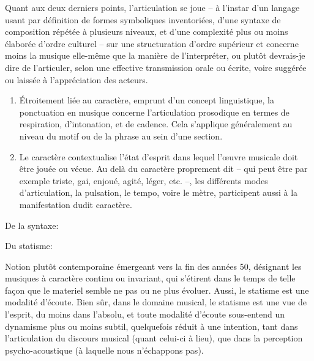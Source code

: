 Quant aux deux derniers points, l'articulation se joue -- à l'instar d'un langage usant par définition de formes symboliques inventoriées, d'une syntaxe de composition répétée à plusieurs niveaux, et d'une complexité plus ou moins élaborée d'ordre culturel -- sur une structuration d'ordre supérieur et concerne moins la musique elle-même que la manière de l'interpréter, ou plutôt devrais-je dire de l'articuler, selon une effective transmission orale ou écrite, voire suggérée ou laissée à l'appréciation des acteurs. 

\begin{enumerate}[resume]

\item {}

Étroitement liée au caractère,  emprunt d'un concept linguistique, la ponctuation en musique concerne l'articulation prosodique en termes de respiration, d'intonation, et de cadence. Cela s'applique généralement au niveau du motif ou de la phrase au sein d'une section.

\item {}

Le caractère contextualise l'état d'esprit dans lequel l'œuvre musicale doit être jouée ou vécue. Au delà du caractère proprement dit -- qui peut être par exemple triste, gai, enjoué, agité, léger, etc. --, les différents modes d'articulation, la pulsation, le tempo, voire le mètre, participent aussi à la manifestation dudit caractère.

\end{enumerate}

\bigskip

De la syntaxe:

\smallskip


\bigskip

Du statisme:

\smallskip 

\noindent Notion plutôt contemporaine émergeant vers la fin des années 50, désignant les musiques à caractère continu ou invariant, qui s'étirent dans le temps de telle façon que le materiel semble ne pas ou ne plus évoluer.  Aussi, le statisme est une modalité d'écoute. 
Bien sûr, dans le domaine musical, le statisme est une vue de l'esprit, du moins dans l'absolu, et toute modalité d'écoute sous-entend un dynamisme plus ou moins subtil, quelquefois réduit à une intention, tant dans l'articulation du discours musical (quant celui-ci à lieu), que dans la perception psycho-acoustique (à laquelle nous n'échappons pas).

